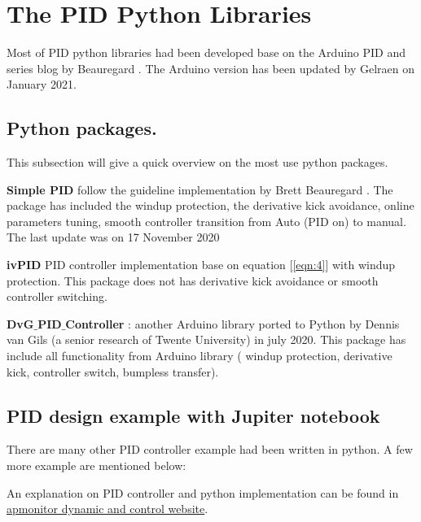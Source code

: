 \section{The PID Python Libraries}

Most of PID python libraries had been developed base on the Arduino PID and series blog by Beauregard \cite{Arduino_PID}  \cite{Improving_PID}. The Arduino version has been updated by 
Gelraen \cite{Arduino_PID_V2} on January 2021.

\subsection{Python packages.}
This subsection will give a quick overview on the most use python packages.

\textbf{Simple PID} \cite{Simple_Pid} follow the guideline implementation by Brett Beauregard  \cite{Improving_PID}. The package has included the windup protection, the derivative kick avoidance, online parameters tuning, smooth controller transition from Auto (PID on) to manual. The last update was on 17 November 2020

\textbf{ivPID} \cite{ivPID} PID controller implementation base on equation [\ref{eqn:4}] with windup protection. This package does not has derivative kick avoidance or smooth controller switching.

\textbf{DvG${\_}$PID${\_}$Controller} \cite{DvG_PID_Controller}: another Arduino library \cite{Arduino_PID} ported to Python by Dennis van Gils (a senior research of Twente University) in july 2020. This package has include all functionality from Arduino library ( windup protection, derivative kick, controller switch, bumpless transfer).

\subsection{PID design example with Jupiter notebook}

There are many other PID controller example had been written in python. A few more example are mentioned below:

An explanation on PID controller and python implementation can be found in \href{https://apmonitor.com/pdc/index.php/Main/ProportionalIntegralDerivative}{apmonitor dynamic and control website}.

